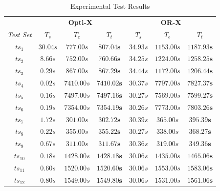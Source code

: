 \begin{table}[h]
    \centering
  \footnotesize
  \begin{tabular}{|c|ccc|ccc|}
    \hline
    &  \multicolumn{3}{c|}{\textbf{\large{Opti-X}}} & \multicolumn{3}{c|}{\textbf{\large{OR-X}}}\\
    \emph{Test Set} & \emph{$T_s$} & \emph{$T_e$} & \emph{$T_t$} & \emph{$T_s$} & \emph{$T_e$} & \emph{$T_t$}\\
    \hline
    $ts_{1}$   &   $30.04s$    &   $777.00s$     &   $\mathbf{807.04s}$     &   $34.93s$    &   $1153.00s$   &   $\mathbf{1187.93s}$ \\
    $ts_{2}$   &   $8.66s$     &   $752.00s$     &   $\mathbf{760.66s}$     &   $34.25s$    &   $1224.00s$   &   $\mathbf{1258.25s}$ \\
    $ts_{3}$   &   $0.29s$     &   $867.00s$     &   $\mathbf{867.29s}$     &   $34.44s$    &   $1172.00s$   &   $\mathbf{1206.44s}$ \\
    \hline
    $ts_{4}$   &   $0.02s$     &   $7410.00s$    &   $\mathbf{7410.02s}$    &   $30.37s$    &   $7797.00s$   &   $\mathbf{7827.37s}$ \\
    $ts_{5}$   &   $0.16s$     &   $7497.00s$    &   $\mathbf{7497.16s}$    &   $30.27s$    &   $7569.00s$   &   $\mathbf{7599.27s}$ \\
    $ts_{6}$   &   $0.19s$     &   $7354.00s$    &   $\mathbf{7354.19s}$    &   $30.26s$    &   $7773.00s$   &   $\mathbf{7803.26s}$ \\
    \hline
    $ts_{7}$   &   $1.72s$     &   $301.00s$     &   $\mathbf{302.72s}$     &   $30.39s$    &   $365.00s$    &   $\mathbf{395.39s}$  \\
    $ts_{8}$   &   $0.22s$     &   $355.00s$     &   $\mathbf{355.22s}$     &   $30.27s$    &   $338.00s$    &   $\mathbf{368.27s}$  \\
    $ts_{9}$   &   $0.67s$     &   $311.00s$     &   $\mathbf{311.67s}$     &   $30.36s$    &   $319.00s$    &   $\mathbf{349.36s}$  \\
    \hline
    $ts_{10}$  &   $0.18s$     &   $1428.00s$    &   $\mathbf{1428.18s}$    &   $30.06s$    &   $1435.00s$   &   $\mathbf{1465.06s}$ \\
    $ts_{11}$  &   $0.60s$     &   $1520.00s$    &   $\mathbf{1520.60s}$    &   $30.06s$    &   $1553.00s$   &   $\mathbf{1583.06s}$ \\
    $ts_{12}$  &   $0.80s$     &   $1549.00s$    &   $\mathbf{1549.80s}$    &   $30.06s$    &   $1531.00s$   &   $\mathbf{1561.06s}$\\
    \hline
  \end{tabular}
  \caption{Experimental Test Results}
  \label{test_results}
\end{table}

